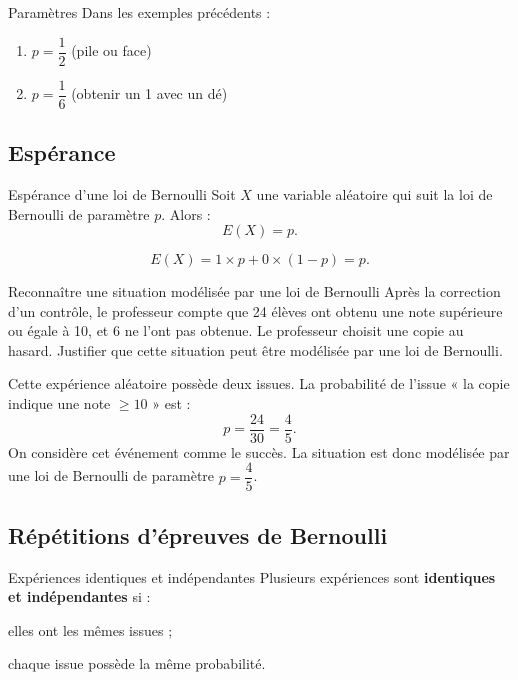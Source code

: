 \begin{ex}{Paramètres}
	Dans les exemples précédents :
	\begin{enumerate}
		\item $p = \dfrac{1}{2}$ \quad (pile ou face)
		\item $p = \dfrac{1}{6}$ \quad (obtenir un 1 avec un dé)
	\end{enumerate}
\end{ex}

\subsection{Espérance}

\begin{prop}{Espérance d'une loi de Bernoulli}
	Soit $X$ une variable aléatoire qui suit la loi de Bernoulli de
	paramètre $p$. Alors :
	\[
		E(X) = p.
	\]
\end{prop}

\begin{demo}{}
	\[
		E(X) = 1 \times p + 0 \times (1-p) = p.
	\]
\end{demo}

\begin{methode}{Reconnaître une situation modélisée par une loi de Bernoulli}
	Après la correction d'un contrôle, le professeur compte que 24 élèves
	ont obtenu une note supérieure ou égale à 10, et 6 ne l'ont pas obtenue.
	Le professeur choisit une copie au hasard. Justifier que cette situation
	peut être modélisée par une loi de Bernoulli.
\end{methode}

\begin{correction}
	Cette expérience aléatoire possède deux issues. La probabilité de
	l'issue « la copie indique une note $\ge 10$ » est :
	\[
		p = \frac{24}{30} = \frac{4}{5}.
	\]
	On considère cet événement comme le succès. La situation est donc
	modélisée par une loi de Bernoulli de paramètre $p = \dfrac{4}{5}$.
\end{correction}

\subsection{Répétitions d'épreuves de Bernoulli}

\begin{defin}{Expériences identiques et indépendantes}
	Plusieurs expériences sont \textbf{identiques et indépendantes} si :
	\bi
	\item elles ont les mêmes issues ;
	\item chaque issue possède la même probabilité.
	\ei
\end{defin}

